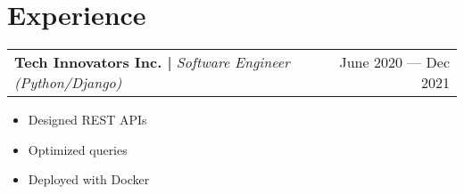 \documentclass{article}%
\begin{document}
%
\normalsize%
\section{Experience}%
\label{sec:Experience}%
\begin{tabularx}{\textwidth}{X r}%
\textbf{Tech Innovators Inc. | }\textit{Software Engineer (Python/Django)}&June 2020 — Dec 2021\\%
\end{tabularx}%
\begin{itemize}%
\item%
Designed REST APIs%
\item%
Optimized queries%
\item%
Deployed with Docker%
\end{itemize}

%
\end{document}
